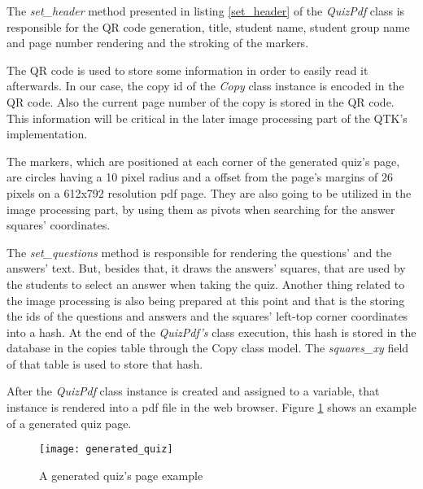 The \textit{set\_header} method presented in listing \ref{set_header} of the \textit{QuizPdf} class is responsible for the QR code generation, title, student name, student group name and page number rendering and the stroking of the markers. 

\vspace{-5pt}



\vspace{5pt}

The QR code is used to store some information in order to easily read it afterwards. In our case, the copy id of the \textit{Copy} class instance 
is encoded in the QR code. Also the current page number of the copy is stored in the QR code. This information will be critical in the later image processing part of the QTK's implementation. 

The markers, which are positioned at each corner of the generated quiz's page, are circles having a 10 pixel radius and a offset from the page's margins of 26 pixels on a 612x792 resolution pdf page. They are also going to be utilized in the image processing part, by using them as pivots when searching for the answer squares' coordinates.

The \textit{set\_questions} method is responsible for rendering the questions' and the answers' text. But, besides that, it draws the answers' squares, that are used by the students to select an answer when taking the quiz. Another thing related to the image processing is also being prepared at this point and that is the storing the ids of the questions and answers and the squares' left-top corner coordinates into a hash. At the end of the \textit{QuizPdf's} class execution, this hash is stored in the database in the copies table through the Copy class model. The \textit{squares\_xy} field of that table is used to store that hash.

After the \textit{QuizPdf} class instance is created and assigned to a variable, that instance is rendered into a pdf file in the web browser. Figure \ref{generated_quiz_page} shows an example of a generated quiz page. 

\begin{figure}[!ht]
\centering
\texttt{[image: generated\_quiz]}
\caption{A generated quiz's page example}\label{generated_quiz_page}
\end{figure}


